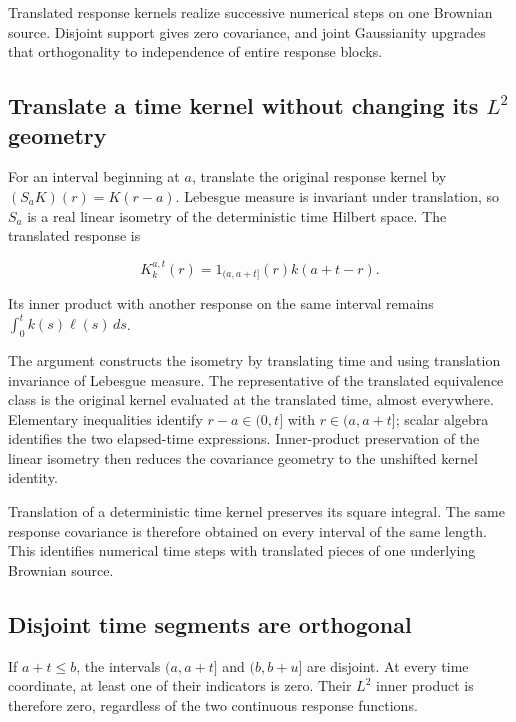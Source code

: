 \documentclass[11pt,a4paper]{report}
\begin{document}
Translated response kernels realize successive numerical steps on one Brownian source. Disjoint support gives zero covariance, and joint Gaussianity upgrades that orthogonality to independence of entire response blocks.

\subsection{\texorpdfstring{Translate a time kernel without changing its \(L^{2}\) geometry}{Translate a time kernel without changing its L² geometry}}
\label{report-step-KineticLangevin-BrownianSegments-lean-1}


For an interval beginning at \(a\), translate the original response kernel by \((S_aK)(r)=K(r-a)\). Lebesgue measure is invariant under translation, so \(S_a\) is a real linear isometry of the deterministic time Hilbert space. The translated response is

\[K^{a,t}_k(r)=1_{(a,a+t]}(r)k(a+t-r).\]

Its inner product with another response on the same interval remains \(\int_0^t k(s)\ell(s)\,ds\).



The argument constructs the isometry by translating time and using translation invariance of Lebesgue measure. The representative of the translated equivalence class is the original kernel evaluated at the translated time, almost everywhere. Elementary inequalities identify \(r-a\in(0,t]\) with \(r\in(a,a+t]\); scalar algebra identifies the two elapsed-time expressions. Inner-product preservation of the linear isometry then reduces the covariance geometry to the unshifted kernel identity.



Translation of a deterministic time kernel preserves its square integral. The same response covariance is therefore obtained on every interval of the same length. This identifies numerical time steps with translated pieces of one underlying Brownian source.

\subsection{\texorpdfstring{Disjoint time segments are orthogonal}{Disjoint time segments are orthogonal}}
\label{report-step-KineticLangevin-BrownianSegments-lean-2}


If \(a+t\le b\), the intervals \((a,a+t]\) and \((b,b+u]\) are disjoint. At every time coordinate, at least one of their indicators is zero. Their \(L^{2}\) inner product is therefore zero, regardless of the two continuous response functions.
\end{document}
